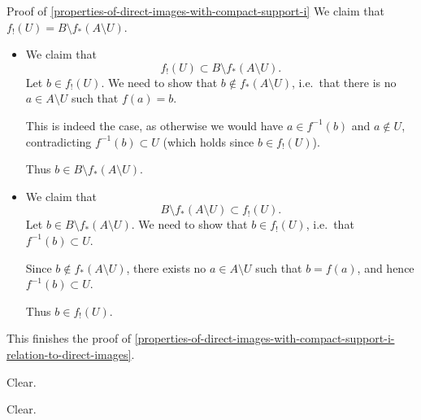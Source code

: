 \begin{Proof}{Proof of \cref{properties-of-direct-images-with-compact-support-i}}
    We claim that $f_{!}(U)=B\setminus f_{*}(A\setminus U)$.
    \begin{itemize}
        \item{}We claim that
            \[
                f_{!}(U)%
                \subset%
                B\setminus f_{*}(A\setminus U).%
            \]%
            Let $b\in f_{!}(U)$. We need to show that $b\nin f_{*}(A\setminus U)$, i.e.\ that there is no $a\in A\setminus U$ such that $f(a)=b$.

            This is indeed the case, as otherwise we would have $a\in f^{-1}(b)$ and $a\nin U$, contradicting $f^{-1}(b)\subset U$ (which holds since $b\in f_{!}(U)$).

            Thus $b\in B\setminus f_{*}(A\setminus U)$.
        \item{}We claim that
            \[
                B\setminus f_{*}(A\setminus U)%
                \subset%
                f_{!}(U).%
            \]%
            Let $b\in B\setminus f_{*}(A\setminus U)$. We need to show that $b\in f_{!}(U)$, i.e.\ that $f^{-1}(b)\subset U$.

            Since $b\nin f_{*}(A\setminus U)$, there exists no $a\in A\setminus U$ such that $b=f(a)$, and hence $f^{-1}(b)\subset U$.

            Thus $b\in f_{!}(U)$.
    \end{itemize}
    This finishes the proof of \cref{properties-of-direct-images-with-compact-support-i-relation-to-direct-images}.

    Clear.

    Clear.
\end{Proof}
